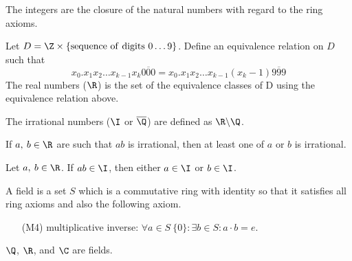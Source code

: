 \documentclass{article}
\begin{document}
\begin{note}
    The integers are the closure of the natural numbers with regard to the ring axioms.
\end{note}
%
\begin{definition}
    Let \(D = \Z \times \{\mathrm{sequence\ of\ digits\ 0\dots 9}\}\).
    Define an equivalence relation on \(D\) such that
    \begin{equation*}
        x_0 . x_1 x_2 \dots x_{k-1} x_k \overline{000} = x_0 . x_1 x_2 \dots x_{k-1} \left(x_k - 1\right)\overline{999}
    \end{equation*}
    The real numbers (\(\R\)) is the set of the equivalence classes of D using the equivalence relation above.
\end{definition}
%
\begin{definition}
    The irrational numbers (\(\I\) or \(\overline{\Q}\)) are defined as \(\R\backslash\Q\).
\end{definition}
\begin{theorem}
    If \(a,\:b\in\R\) are such that \(ab\) is irrational, then at least one of \(a\) or \(b\) is irrational.
\end{theorem}
%
\begin{note}
    Let \(a,\: b\in \R\). If \(ab\in\I\), then either \(a\in\I\) or \(b\in\I\).
\end{note}
%
\begin{tcolorboxlarge}[title={Field Axioms}]
    \begin{definition}[Field]
        A field is a set \(S\) which is a commutative ring with identity so that it satisfies all ring axioms and also the following axiom.
    \end{definition}
    \begin{enumerate}
        \item[(M4)] multiplicative inverse: \(\forall a \in S \ \{0\}:\exists b \in S: a\cdot b=e\).
    \end{enumerate}
\end{tcolorboxlarge}
\begin{note}
    \(\Q\), \(\R\), and \(\C\) are fields.
\end{note}
%
\end{document}
